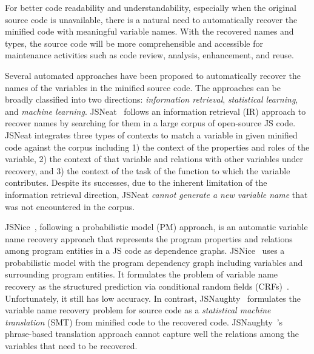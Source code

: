 For better code readability and understandability, especially when the
original source code is unavailable, there is a natural need to
automatically recover the minified code with meaningful variable
names. With the recovered names and types, the source code will be
more comprehensible and accessible for maintenance activities such
as code review, analysis, enhancement, and reuse.




Several automated approaches have been proposed to automatically
recover the names of the variables in the minified source code.  The
approaches can be broadly classified into two directions: {\em
  information retrieval}, {\em statistical learning}, and {\em machine
  learning}.  JSNeat~\cite{icse19} follows an information retrieval
(IR) approach to recover names by searching for them in a large corpus
of open-source JS code. JSNeat integrates three types of contexts to
match a variable in given minified code against the corpus including
1) the context of the properties and roles of the variable, 2) the
context of that variable and relations with other variables under
recovery, and 3) the context of the task of the function to which the
variable contributes.  Despite its successes, due to the inherent
limitation of the information retrieval direction, JSNeat {\em cannot
  generate a new variable name} that was not encountered in the
corpus.

JSNice~\cite{JSNice2015}, following a probabilistic model (PM)
approach, is an automatic variable name recovery approach that
represents the program properties and relations among program entities
in a JS code as dependence graphs. JSNice~\cite{JSNice2015} uses a
probabilistic model with the program dependency graph including
variables and surrounding program entities. It formulates the problem
of variable name recovery as the structured prediction via conditional
random fields (CRFs)~\cite{JSNice2015}. Unfortunately, it still has
low accuracy.
%
In contrast, JSNaughty~\cite{JSNaughty2017} formulates the variable
name recovery problem for source code as a {\em statistical machine
translation} (SMT) from minified code to the recovered
code. JSNaughty~\cite{JSNaughty2017}'s phrase-based translation
approach cannot capture well the relations among the variables that
need to be recovered.

